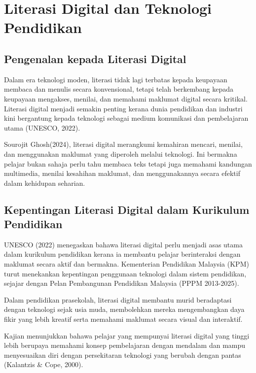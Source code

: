 \section{Literasi Digital dan Teknologi Pendidikan}

\subsection{Pengenalan kepada Literasi Digital}

Dalam era teknologi moden, literasi tidak lagi terbatas kepada keupayaan membaca dan menulis secara konvensional, tetapi telah berkembang kepada keupayaan mengakses, menilai, dan memahami maklumat digital secara kritikal. Literasi digital menjadi semakin penting kerana dunia pendidikan dan industri kini bergantung kepada teknologi sebagai medium komunikasi dan pembelajaran utama (UNESCO, 2022).

\hspace{1cm}Sourojit Ghosh(2024), literasi digital merangkumi kemahiran mencari, menilai, dan menggunakan maklumat yang diperoleh melalui teknologi. Ini bermakna pelajar bukan sahaja perlu tahu membaca teks tetapi juga memahami kandungan multimedia, menilai kesahihan maklumat, dan menggunakannya secara efektif dalam kehidupan seharian.

\subsection{Kepentingan Literasi Digital dalam Kurikulum Pendidikan}

UNESCO (2022) menegaskan bahawa literasi digital perlu menjadi asas utama dalam kurikulum pendidikan kerana ia membantu pelajar berinteraksi dengan maklumat secara aktif dan bermakna. Kementerian Pendidikan Malaysia (KPM) turut menekankan kepentingan penggunaan teknologi dalam sistem pendidikan, sejajar dengan Pelan Pembangunan Pendidikan Malaysia (PPPM 2013-2025).

\hspace{1cm}Dalam pendidikan prasekolah, literasi digital membantu murid beradaptasi dengan teknologi sejak usia muda, membolehkan mereka mengembangkan daya fikir yang lebih kreatif serta memahami maklumat secara visual dan interaktif.

\hspace{1cm}Kajian menunjukkan bahawa pelajar yang mempunyai literasi digital yang tinggi lebih berupaya memahami konsep pembelajaran dengan mendalam dan mampu menyesuaikan diri dengan persekitaran teknologi yang berubah dengan pantas (Kalantzis \& Cope, 2000).


